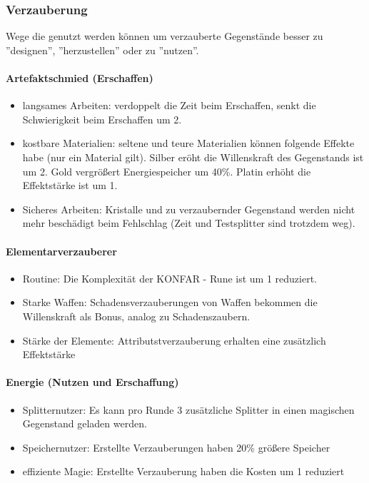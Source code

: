 \documentclass{article}
\begin{document}
\subsubsection{Verzauberung}

Wege die genutzt werden können um verzauberte Gegenstände besser zu ''designen'', ''herzustellen'' oder zu ''nutzen''.

\paragraph{Artefaktschmied (Erschaffen)}

\begin{itemize}
\item langsames Arbeiten: verdoppelt die Zeit beim Erschaffen, senkt die Schwierigkeit beim Erschaffen um 2.
\item kostbare Materialien: seltene und teure Materialien können folgende Effekte habe (nur ein Material gilt). Silber eröht die Willenskraft des Gegenstands ist um 2. Gold vergrößert Energiespeicher um 40\%. Platin erhöht die Effektstärke ist um 1.
\item Sicheres Arbeiten: Kristalle und zu verzaubernder Gegenstand werden nicht mehr beschädigt beim Fehlschlag (Zeit und Testsplitter sind trotzdem weg).
\end{itemize}

\paragraph{Elementarverzauberer}

\begin{itemize}
\item Routine: Die Komplexität der KONFAR - Rune ist um 1 reduziert.
\item Starke Waffen: Schadensverzauberungen von Waffen bekommen die Willenskraft als Bonus, analog zu Schadenszaubern.
\item Stärke der Elemente: Attributstverzauberung erhalten eine zusätzlich Effektstärke
\end{itemize}

\paragraph{Energie (Nutzen und Erschaffung)}

\begin{itemize}
\item Splitternutzer: Es kann pro Runde 3 zusätzliche Splitter in einen magischen Gegenstand geladen werden.
\item Speichernutzer: Erstellte Verzauberungen haben 20\% größere Speicher
\item effiziente Magie: Erstellte Verzauberung haben die Kosten um 1 reduziert
\end{itemize}
\end{document}

